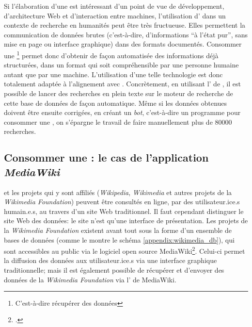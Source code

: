 Si l'élaboration d'une \api{} est intéressant d'un point de vue de développement, d'architecture Web et d'interaction entre machines, l'utilisation d'\api{} dans un contexte de recherche en humanités peut être très fructueuse. Elles permettent la communication de données brutes (c'est-à-dire, d'informations \enquote{à l'état pur}, sans mise en page ou interface graphique) dans des formats documentés. Consommer une \api{}\footnote{C'est-à-dire récupérer des données} permet donc d'obtenir de façon automatisée des informations déjà structurées, dans un format qui soit compréhensible par une personne humaine autant que par une machine. L'utilisation d'une telle technologie est donc totalement adaptée à l'alignement avec \wkd{}. Concrètement, en utilisant l'\api{} de \wkd{}, il est possible de lancer des recherches en plein texte sur le moteur de recherche de cette base de données de façon automatique. Même si les données obtenues doivent être ensuite corrigées, en créant un  \textit{bot}, c'est-à-dire un programme pour consommer une \api{}, on s'épargne le travail de faire manuellement plus de 80000 recherches.

\subsection{Consommer une \api{}: le cas de l'application \textit{MediaWiki}}
\wkd{} et les projets qui y sont affiliés (\textit{Wikipedia}, \textit{Wikimedia} et autres projets de la \textit{Wikimedia Foundation}) peuvent être consultés en ligne, par des utilisateur.ice.s humain.e.s, au travers d'un site Web traditionnel. Il faut cependant distinguer le site Web des données: le site n'est qu'une interface de présentation. Les projets de la \textit{Wikimedia Foundation} existent avant tout sous la forme d'un ensemble de bases de données (comme le montre le schéma \ref{appendix:wikimedia_db}), qui sont accessibles au public via le logiciel \gls{open source} MediaWiki\footcite{noauthor_wikimedia_2022}. Celui-ci permet la diffusion des données aux utilisateur.ice.s via une interface graphique traditionnelle; mais il est également possible de récupérer et d'envoyer des données de la \textit{Wikimedia Foundation} via l'\api{} de MediaWiki.

